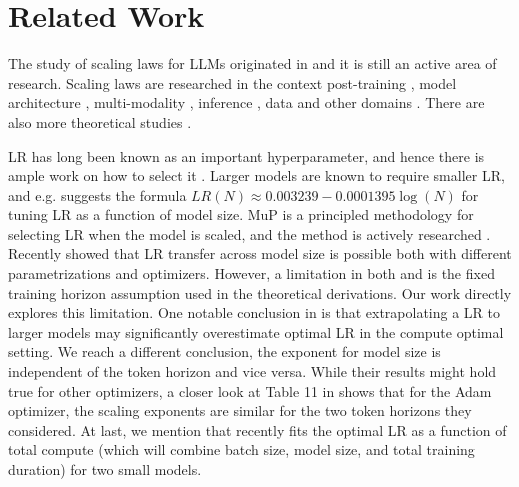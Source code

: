 \section{Related Work}

The study of scaling laws for LLMs originated in \cite{kaplan2020scalinglaw} and it is still an active area of research.  Scaling laws are researched in the context post-training \citep{lin2024selecting, zhang2024scaling, gao2023scaling}, model architecture \citep{krajewski2024scaling, alabdulmohsin2024getting, frantar2023scaling, wang2023data}, multi-modality \citep{aghajanyan2023scaling, cherti2023reproducible}, inference \citep{sardana2023beyond}, data \citep{dohmatob2024tale, fernandes2023scaling} and other domains \citep{zhang2024wukong, neumann2022scaling, kadra2024scaling}. There are also more theoretical studies \citep{michaud2024quantization, caballero2022broken}.

LR has long been known as an important hyperparameter, and hence there is ample work on how to select it \citep{imagenet1h}. Larger models are known to require smaller LR, and e.g. \cite{kaplan2020scalinglaw} suggests the formula $LR(N) \approx 0.003239 - 0.0001395 \log(N)$ for tuning LR as a function of model size. MuP \citep{mup} is a principled methodology for selecting LR when the model is scaled, and the method is actively researched \citep{testingmup, everett2024scaling, noci2024learning, blake2024u}. Recently \cite{everett2024scaling} showed that LR transfer across model size is possible both with different parametrizations and optimizers. However, a limitation in both \cite{mup} and \cite{everett2024scaling} is the fixed training horizon assumption used in the theoretical derivations. Our work directly explores this limitation. One notable conclusion in \cite{everett2024scaling} is that extrapolating a LR to larger models may significantly overestimate optimal LR in the compute optimal setting. We reach a different conclusion, the exponent for model size is independent of the token horizon and vice versa. While their results might hold true for other optimizers, a closer look at Table 11 in \cite{everett2024scaling} shows that for the Adam optimizer, the scaling exponents are similar for the two token horizons they considered.  At last, we mention that \cite{deepseek_scaling} recently fits the optimal LR as a function of total compute (which will combine batch size, model size, and total training duration) for two small models. 


